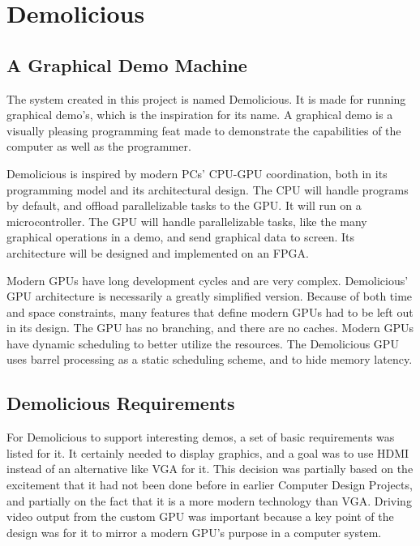 \documentclass[../main/report.tex]{subfiles}
\begin{document}
\chapter{Demolicious}
\label{sec:demolicious}



\section{A Graphical Demo Machine}

The system created in this project is named Demolicious.
It is made for running graphical demo's, which is the inspiration for its name.
A graphical demo is a visually pleasing programming feat made to demonstrate the capabilities of the computer as well as the programmer.

Demolicious is inspired by modern PCs' CPU-GPU coordination, both in its programming model and its architectural design.
The CPU will handle programs by default, and offload parallelizable tasks to the GPU.
It will run on a microcontroller.
The GPU will handle parallelizable tasks, like the many graphical operations in a demo, and send graphical data to screen.
Its architecture will be designed and implemented on an FPGA.

Modern GPUs have long development cycles and are very complex.
Demolicious' GPU architecture is necessarily a greatly simplified version.
Because of both time and space constraints, many features that define modern GPUs had to be left out in its design.
The GPU has no branching, and there are no caches.
Modern GPUs have dynamic scheduling to better utilize the resources.
The Demolicious GPU uses barrel processing as a static scheduling scheme, and to hide memory latency.

\section{Demolicious Requirements}

For Demolicious to support interesting demos, a set of basic requirements was listed for it.
It certainly needed to display graphics, and a goal was to use HDMI instead of an alternative like VGA for it.
This decision was partially based on the excitement that it had not been done before in earlier Computer Design Projects, and partially on the fact that it is a more modern technology than VGA.
Driving video output from the custom GPU was important because a key point of the design was for it to mirror a modern GPU's purpose in a computer system.
\end{document}
